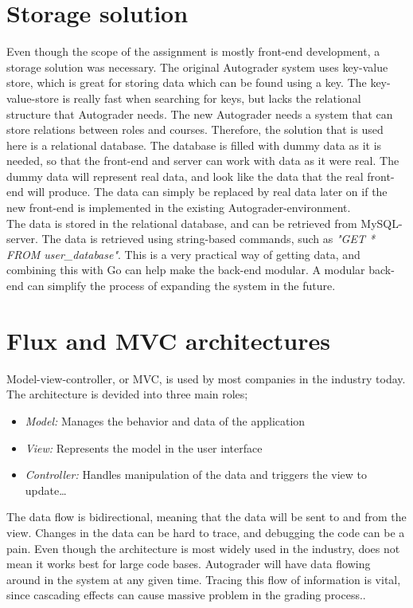 \section{Storage solution}
Even though the scope of the assignment is mostly front-end development, a storage solution was necessary. The original Autograder system uses key-value store, which is great for storing data which can be found using a key. The key-value-store is really fast when searching for keys, but lacks the relational structure that Autograder needs. The new Autograder needs a system that can store relations between roles and courses. Therefore, the solution that is used here is a relational database. The database is filled with dummy data as it is needed, so that the front-end and server can work with data as it were real. The dummy data will represent real data, and look like the data that the real front-end will produce. The data can simply be replaced by real data later on if the new front-end is implemented in the existing Autograder-environment.
\\The data is stored in the relational database, and can be retrieved from MySQL-server. The data is retrieved using string-based commands, such as \emph{"GET * FROM user\_database"}. This is a very practical way of getting data, and combining this with Go can help make the back-end modular. A modular back-end can simplify the process of expanding the system in the future.

\section{Flux and MVC architectures}
Model-view-controller, or MVC, is used by most companies in the industry today. The architecture is devided into three main roles;

\begin{itemize}  
\item \emph{Model:} Manages the behavior and data of the application
\item \emph{View:} Represents the model in the user interface
\item \emph{Controller:} Handles manipulation of the data and triggers the view to update\ldots 
\end{itemize}

The data flow is bidirectional, meaning that the data will be sent to and from the view. Changes in the data can be hard to trace, and debugging the code can be a pain. Even though the architecture is most widely used in the industry, does not mean it works best for large code bases. Autograder will have data flowing around in the system at any given time. Tracing this flow of information is vital, since cascading effects can cause massive problem in the grading process.. 

